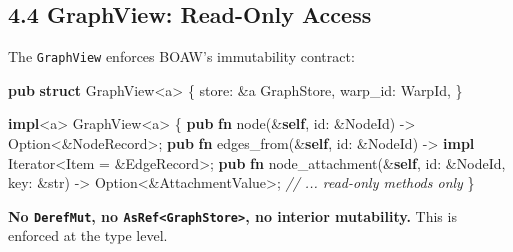 \documentclass[
]{book}
\newenvironment{Shaded}{}{}
\newcommand{\BuiltInTok}[1]{\textcolor[rgb]{0.00,0.50,0.00}{#1}}
\newcommand{\CommentTok}[1]{\textcolor[rgb]{0.38,0.63,0.69}{\textit{#1}}}
\newcommand{\DataTypeTok}[1]{\textcolor[rgb]{0.56,0.13,0.00}{#1}}
\newcommand{\KeywordTok}[1]{\textcolor[rgb]{0.00,0.44,0.13}{\textbf{#1}}}
\newcommand{\NormalTok}[1]{#1}
\newcommand{\OperatorTok}[1]{\textcolor[rgb]{0.40,0.40,0.40}{#1}}
\newcommand{\OtherTok}[1]{\textcolor[rgb]{0.00,0.44,0.13}{#1}}
\begin{document}
\subsection{4.4 GraphView: Read-Only
Access}\label{graphview-read-only-access}

The \texttt{GraphView} enforces BOAW's immutability contract:

\begin{Shaded}
\begin{Highlighting}[]
\KeywordTok{pub} \KeywordTok{struct}\NormalTok{ GraphView}\OperatorTok{\textless{}}\OtherTok{\textquotesingle{}a}\OperatorTok{\textgreater{}} \OperatorTok{\{}
\NormalTok{    store}\OperatorTok{:} \OperatorTok{\&}\OtherTok{\textquotesingle{}a}\NormalTok{ GraphStore}\OperatorTok{,}
\NormalTok{    warp\_id}\OperatorTok{:}\NormalTok{ WarpId}\OperatorTok{,}
\OperatorTok{\}}

\KeywordTok{impl}\OperatorTok{\textless{}}\OtherTok{\textquotesingle{}a}\OperatorTok{\textgreater{}}\NormalTok{ GraphView}\OperatorTok{\textless{}}\OtherTok{\textquotesingle{}a}\OperatorTok{\textgreater{}} \OperatorTok{\{}
    \KeywordTok{pub} \KeywordTok{fn}\NormalTok{ node(}\OperatorTok{\&}\KeywordTok{self}\OperatorTok{,}\NormalTok{ id}\OperatorTok{:} \OperatorTok{\&}\NormalTok{NodeId) }\OperatorTok{{-}\textgreater{}} \DataTypeTok{Option}\OperatorTok{\textless{}\&}\NormalTok{NodeRecord}\OperatorTok{\textgreater{};}
    \KeywordTok{pub} \KeywordTok{fn}\NormalTok{ edges\_from(}\OperatorTok{\&}\KeywordTok{self}\OperatorTok{,}\NormalTok{ id}\OperatorTok{:} \OperatorTok{\&}\NormalTok{NodeId) }\OperatorTok{{-}\textgreater{}} \KeywordTok{impl} \BuiltInTok{Iterator}\OperatorTok{\textless{}}\NormalTok{Item }\OperatorTok{=} \OperatorTok{\&}\NormalTok{EdgeRecord}\OperatorTok{\textgreater{};}
    \KeywordTok{pub} \KeywordTok{fn}\NormalTok{ node\_attachment(}\OperatorTok{\&}\KeywordTok{self}\OperatorTok{,}\NormalTok{ id}\OperatorTok{:} \OperatorTok{\&}\NormalTok{NodeId}\OperatorTok{,}\NormalTok{ key}\OperatorTok{:} \OperatorTok{\&}\DataTypeTok{str}\NormalTok{) }\OperatorTok{{-}\textgreater{}} \DataTypeTok{Option}\OperatorTok{\textless{}\&}\NormalTok{AttachmentValue}\OperatorTok{\textgreater{};}
    \CommentTok{// ... read{-}only methods only}
\OperatorTok{\}}
\end{Highlighting}
\end{Shaded}

\textbf{No \texttt{DerefMut}, no
\texttt{AsRef\textless{}GraphStore\textgreater{}}, no interior
mutability.} This is enforced at the type level.
\end{document}
